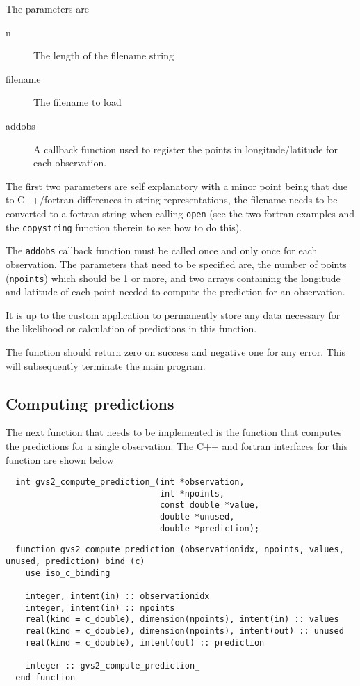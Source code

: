 \documentclass{article}
\begin{document}
The parameters are

\begin{description}
\item[n] The length of the filename string
\item[filename] The filename to load
\item[addobs] A callback function used to register the points in longitude/latitude for each
  observation.
\end{description}

The first two parameters are self explanatory with a minor point being that due
to C++/fortran differences in string representations, the filename needs to be
converted to a fortran string when calling {\tt open} (see the two fortran
examples and the {\tt copystring} function therein to see how to do this).

The {\tt addobs} callback function must be called once and only once for each
observation. The parameters that need to be specified are, the number of
points ({\tt npoints}) which should be 1 or more, and two arrays containing
the longitude and latitude of each point needed to compute the prediction
for an observation.

It is up to the custom application to permanently store any data
necessary for the likelihood or calculation of predictions in this
function.

The function should return zero on success and negative one for any
error.  This will subsequently terminate the main program.

\subsection{Computing predictions}

The next function that needs to be implemented is the function that computes
the predictions for a single observation. The C++ and fortran interfaces for this function
are shown below


\begin{verbatim}
  int gvs2_compute_prediction_(int *observation,
                               int *npoints,
                               const double *value,
                               double *unused,
                               double *prediction);
\end{verbatim}

\begin{verbatim}
  function gvs2_compute_prediction_(observationidx, npoints, values, unused, prediction) bind (c)
    use iso_c_binding
    
    integer, intent(in) :: observationidx
    integer, intent(in) :: npoints
    real(kind = c_double), dimension(npoints), intent(in) :: values
    real(kind = c_double), dimension(npoints), intent(out) :: unused
    real(kind = c_double), intent(out) :: prediction

    integer :: gvs2_compute_prediction_
  end function
\end{verbatim}
\end{document}
